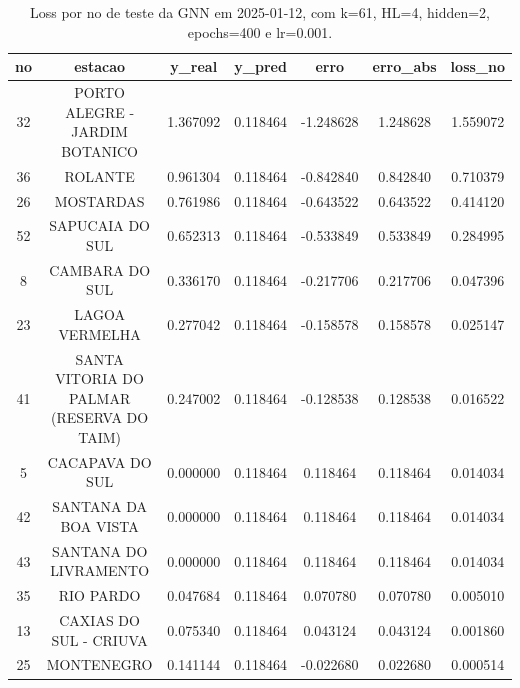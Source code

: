 \begin{table}[h]
\centering
\caption{Loss por no de teste da GNN em 2025-01-12, com k=61, HL=4, hidden=2, epochs=400 e lr=0.001.}
\label{tab:gnn_loss_k61_hl4_h2_e400_d20250112}
\begin{tabular}{ccccccc}
\toprule
no & estacao & y\_real & y\_pred & erro & erro\_abs & loss\_no \\
\midrule
32 & PORTO ALEGRE - JARDIM BOTANICO & 1.367092 & 0.118464 & -1.248628 & 1.248628 & 1.559072 \\
36 & ROLANTE & 0.961304 & 0.118464 & -0.842840 & 0.842840 & 0.710379 \\
26 & MOSTARDAS & 0.761986 & 0.118464 & -0.643522 & 0.643522 & 0.414120 \\
52 & SAPUCAIA DO SUL & 0.652313 & 0.118464 & -0.533849 & 0.533849 & 0.284995 \\
8 & CAMBARA DO SUL & 0.336170 & 0.118464 & -0.217706 & 0.217706 & 0.047396 \\
23 & LAGOA VERMELHA & 0.277042 & 0.118464 & -0.158578 & 0.158578 & 0.025147 \\
41 & SANTA VITORIA DO PALMAR (RESERVA DO TAIM) & 0.247002 & 0.118464 & -0.128538 & 0.128538 & 0.016522 \\
5 & CACAPAVA DO SUL & 0.000000 & 0.118464 & 0.118464 & 0.118464 & 0.014034 \\
42 & SANTANA DA BOA VISTA & 0.000000 & 0.118464 & 0.118464 & 0.118464 & 0.014034 \\
43 & SANTANA DO LIVRAMENTO & 0.000000 & 0.118464 & 0.118464 & 0.118464 & 0.014034 \\
35 & RIO PARDO & 0.047684 & 0.118464 & 0.070780 & 0.070780 & 0.005010 \\
13 & CAXIAS DO SUL - CRIUVA & 0.075340 & 0.118464 & 0.043124 & 0.043124 & 0.001860 \\
25 & MONTENEGRO & 0.141144 & 0.118464 & -0.022680 & 0.022680 & 0.000514 \\
\bottomrule
\end{tabular}
\end{table}
